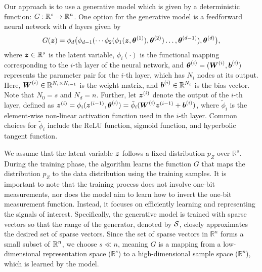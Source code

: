 \documentclass[journal]{IEEEtran}
\begin{document}
Our approach is to use a generative model which is given by a deterministic function: $G:\mathbb{R}^s\to\mathbb{R}^n$. One option for the generative model is a feedforward neural network with $d$ layers given by
\begin{equation}
G(\boldsymbol{z}) = \phi_d \big(\phi_{d-1} (\cdots \phi_2(\phi_1(\boldsymbol{z}, \boldsymbol{\theta}^{(1)}), \boldsymbol{\theta}^{(2)})\ldots, \boldsymbol{\theta}^{(d-1)}), \boldsymbol{\theta}^{(d)}\big),
\end{equation}
where $\boldsymbol{z} \in \mathbb{R}^s$ is the latent variable, $\phi_i(\cdot)$ is the functional mapping corresponding to the $i$-th layer of the neural network, and $\boldsymbol{\theta}^{(i)} = (\boldsymbol{W}^{(i)}, \boldsymbol{b}^{(i)})$ represents the parameter pair for the $i$-th layer, which has $N_i$ nodes at its output. Here, $\boldsymbol{W}^{(i)} \in \mathbb{R}^{N_i \times N_{i-1}}$ is the weight matrix, and $\boldsymbol{b}^{(i)} \in \mathbb{R}^{N_i}$ is the bias vector. Note that $N_0 = s$ and $N_d = n$. 
Further, let $\boldsymbol{z}^{(i)}$ denote the output of the $i$-th layer, defined as $\boldsymbol{z}^{(i)} = \phi_i(\boldsymbol{z}^{(i-1)}, \boldsymbol{\theta}^{(i)}) = \tilde{\phi}_i(\boldsymbol{W}^{(i)} \boldsymbol{z}^{(i-1)} + \boldsymbol{b}^{(i)})$, where $\tilde{\phi}_i$ is the element-wise non-linear activation function used in the $i$-th layer. Common choices for $\tilde{\phi}_i$ include the ReLU function, sigmoid function, and hyperbolic tangent function.

We assume that the latent variable $\boldsymbol{z}$ follows a fixed distribution $p_Z$ over $\mathbb{R}^s$. During the training phase, the algorithm learns the function $G$ that maps the distribution $p_Z$ to the data distribution using the training samples. It is important to note that the training process does not involve one-bit measurements, nor does the model aim to learn how to invert the one-bit measurement function. Instead, it focuses on efficiently learning and representing the signals of interest. Specifically, the generative model is trained with sparse vectors so that the range of the generator, denoted by $\mathcal{S}$, closely approximates the desired set of sparse vectors. Since the set of sparse vectors in $\mathbb{R}^n$ forms a small subset of $\mathbb{R}^n$, we choose $s \ll n$, meaning $G$ is a mapping from a low-dimensional representation space ($\mathbb{R}^s$) to a high-dimensional sample space ($\mathbb{R}^n$), which is learned by the model. 
\end{document}
